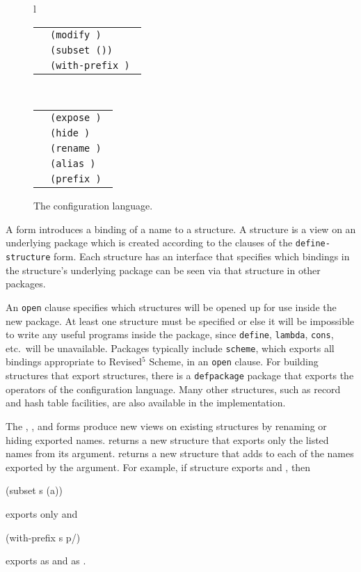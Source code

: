 \begin{figure}[htb]
\begin{tabular}{l}
\begin{tabular}{rl}
        \altz{} & \tt(modify \syn{structure} \arbno{\syn{modifier}}) \\
        \altz{} & \tt(subset \syn{structure} (\arbno{\syn{name}})) \\
        \altz{} & \tt(with-prefix \syn{structure} \syn{name})
   \end{tabular}
   \\
   \begin{tabular}{rl}
   \syn{modifier} \goesto{} & \tt(expose \arbno{\syn{name}}) \\
        \altz{} & \tt(hide \arbno{\syn{name}}) \\
        \altz{} & \tt(rename \arbno{(\syn{name}$_0$ \syn{name}$_1$)}) \\
        \altz{} & \tt(alias \arbno{(\syn{name}$_0$ \syn{name}$_1$)}) \\
        \altz{} & \tt(prefix \syn{name})
   \end{tabular}
 \end{tabular}
 \caption{The configuration language.}
\label{module-language-figure}
\end{figure}

A  form introduces a binding of a name to a
structure.  A structure is a view on an underlying package which is
created according to the clauses of the {\tt define-structure} form.
Each structure has an interface that specifies which bindings in the
structure's underlying package can be seen via that structure in other
packages.

An {\tt open} clause specifies which structures will be opened up for
 use inside the new package.
At least one structure must be specified or else it will be impossible to
 write any useful programs inside the package, since {\tt define},
 {\tt lambda}, {\tt cons}, etc.\ will be unavailable.
Packages typically include {\tt scheme}, which exports all bindings
 appropriate to Revised$^5$ Scheme, in an {\tt open} clause.
For building structures that export structures, there is a {\tt defpackage}
 package that exports the operators of the configuration language.
Many other structures, such as record and hash table facilities, are also
 available in the \hack{} implementation.

The , , and
  forms produce new
 views on existing structures by renaming or hiding exported names.
 returns a new structure that exports only the listed names
 from its  argument.
 returns a new structure that adds 
 to each of the names exported by the  argument.
For example, if structure  exports  and ,
 then
\begin{example}
(subset s (a))
\end{example}
 exports only  and
\begin{example}
(with-prefix s p/)
\end{example}
exports  as  and  as .

